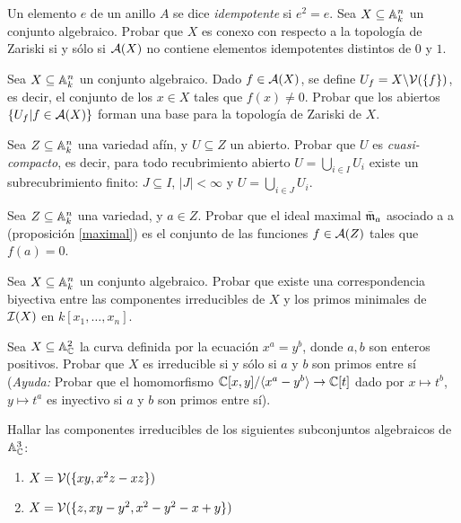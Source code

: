 \documentclass[ACGA.tex]{subfiles}
\begin{document}
\begin{ejer}
 Un elemento $e$ de un anillo $A$ se dice \emph{idempotente} si $e^2=e$. Sea $X\subseteq\mathbb{A}^n_k$ un conjunto algebraico. Probar que $X$ es conexo con respecto a la topología de Zariski si y sólo si $\mathcal{A}(X)$ no contiene elementos idempotentes distintos de $0$ y $1$.
\end{ejer}

\begin{ejer}
 Sea $X\subseteq\mathbb{A}^n_k$ un conjunto algebraico. Dado $f\in\mathcal{A}(X)$, se define $U_f=X\backslash \mathcal{V}(\{f\})$, es decir, el conjunto de los $x\in X$ tales que $f(x)\neq 0$. Probar que los abiertos $\{U_f|f\in \mathcal{A}(X)\}$ forman una base para la topología de Zariski de $X$.
\end{ejer}

\begin{ejer}\label{cuasi-compacto}
 Sea $Z\subseteq\mathbb{A}^n_k$ una variedad afín, y $U\subseteq Z$ un abierto. Probar que $U$ es \emph{cuasi-compacto}, es decir, para todo recubrimiento abierto $U=\bigcup_{i\in I}U_i$ existe un subrecubrimiento finito: $J\subseteq I$, $|J|<\infty$ y $U=\bigcup_{i\in J}U_i$. 
\end{ejer}

\begin{ejer}\label{maximal2}
 Sea $Z\subseteq\mathbb{A}^n_k$ una variedad, y $a\in Z$. Probar que el ideal maximal $\bar{{\mathfrak{m}}}_a$ asociado a a (proposición \ref{maximal}) es el conjunto de las funciones $f\in\mathcal{A}(Z)$ tales que $f(a)=0$.
\end{ejer}



\begin{ejer}
 Sea $X\subseteq\mathbb{A}^n_k$ un conjunto algebraico. Probar que existe una correspondencia biyectiva entre las componentes irreducibles de $X$ y los primos minimales de $\mathcal{I}(X)$ en $k[x_1,\ldots,x_n]$.
\end{ejer}

\begin{ejer}
 Sea $X\subseteq\mathbb{A}^2_{\mathbb{C}}$ la curva definida por la ecuación $x^a=y^b$, donde $a,b$ son enteros positivos. Probar que $X$ es irreducible si y sólo si $a$ y $b$ son primos entre sí (\emph{Ayuda: } Probar que el homomorfismo $\mathbb{C}[x,y]/\langle x^a-y^b\rangle\to\mathbb{C}[t]$ dado por $x\mapsto t^b$, $y\mapsto t^a$ es inyectivo si $a$ y $b$ son primos entre sí).
\end{ejer}


\begin{ejer}
 Hallar las componentes irreducibles de los siguientes subconjuntos algebraicos de $\mathbb{A}^3_{\mathbb{C}}$:
\begin{enumerate}
 \item $X=\mathcal{V}(\{xy,x^2z-xz\})$
\item $X=\mathcal{V}(\{z,xy-y^2,x^2-y^2-x+y\})$
\end{enumerate}

\end{ejer}
\end{document}
